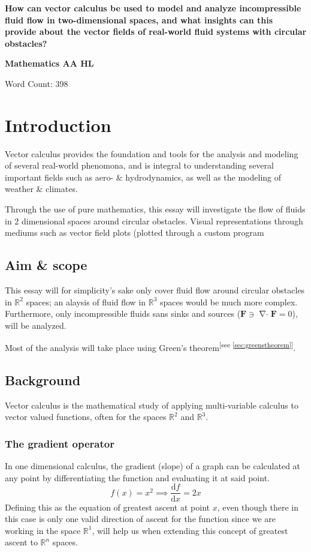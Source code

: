 \documentclass[a4paper, 12pt]{article} %
\newcommand{\researchquestion}{How can vector calculus be used to model and analyze incompressible fluid flow in two-dimensional spaces, and what insights can this provide about the vector fields of real-world fluid systems with circular obstacles?}
\newcommand{\fatf}{\mathbf{F}} %
\newcommand{\referto}[1]{\textsuperscript{\color{darkgray}\tiny[see \ref{#1}]}} %
\newcommand{\der}[2]{\frac{\mathrm{d} #1}{\mathrm{d} #2}} %
\DeclareMathOperator{\divergence}{\nabla\cdot} %
\begin{document}
\begin{titlepage} %
	\begin{center}
		\vspace*{0.5cm}
		\Large
		\textbf{\researchquestion}

		\vspace{1.5cm}
		\large
		\textbf{Mathematics AA HL}

		\vfill{}\color{darkgray}
		Word Count: 398 %
	\end{center}
\end{titlepage}

\tableofcontents\newpage %

\section{Introduction}
Vector calculus provides the foundation and tools for the analysis and modeling of several real-world phenomona, and is integral to understanding several important fields such as aero- \& hydrodynamics, as well as the modeling of weather \& climates. 

Through the use of pure mathematics, this essay will investigate the flow of fluids in 2 dimensional spaces around circular obstacles. Visual representations through mediums such as vector field plots (plotted through a custom program
\subsection{Aim \& scope}
This essay will for simplicity's sake only cover fluid flow around circular obstacles in $\mathbb{R}^2$ spaces; an alaysis of fluid flow in $\mathbb{R}^3$ spaces would be much more complex.
Furthermore, only incompressible fluids sans sinks and sources ($\fatf\ni\divergence\fatf=0$), will be analyzed.

Most of the analysis will take place using Green's theorem\referto{sec:greenstheorem}.

\subsection{Background}
Vector calculus is the mathematical study of applying multi-variable calculus to vector valued functions, often for the spaces $\mathbb{R}^2$ and $\mathbb{R}^3$.

\subsubsection{The gradient operator}
In one dimensional calculus, the gradient (slope) of a graph can be calculated at any point by differentiating the function and evaluating it at said point. 
$$f(x)=x^2\implies\der{f}{x}=2x$$
Defining this as the equation of greatest ascent at point $x$, even though there in this case is only one valid direction of ascent for the function since we are working in the space $\mathbb{R}^1$, will help us when extending this concept of greatest ascent to $\mathbb{R}^n$ spaces.
\end{document}
